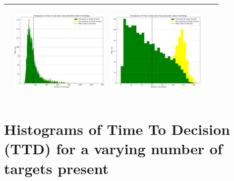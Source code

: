 \begin{landscape}
\begin{table}[h!]
\begin{tabular}{ | m{8mm} | c | c | c | c |}
\begin{minipage}[c][48mm][c]{48mm}
    \end{minipage}
    &
    \begin{minipage}[c][48mm][c]{48mm}
      \includegraphics[width=48mm, height=48mm]{Chapters/MultiAgentTargetDetection/Figs/Histograms/MiscalibratedSensor/05-02/05-02RandomHistogram.png}
    \end{minipage}
    &
    \begin{minipage}[c][48mm][c]{48mm}
      \includegraphics[width=48mm, height=48mm]{Chapters/MultiAgentTargetDetection/Figs/Histograms/MiscalibratedSensor/05-02/05-02SaccadicHistogram.png}
    \end{minipage}
    \\
    \hline
   
  \end{tabular}
  \label{table:HistVaryingSensorModelParams}
\end{table}
\break



\vspace*{\fill}
\section{Histograms of Time To Decision (TTD) for a varying number of targets present}


\end{landscape}

